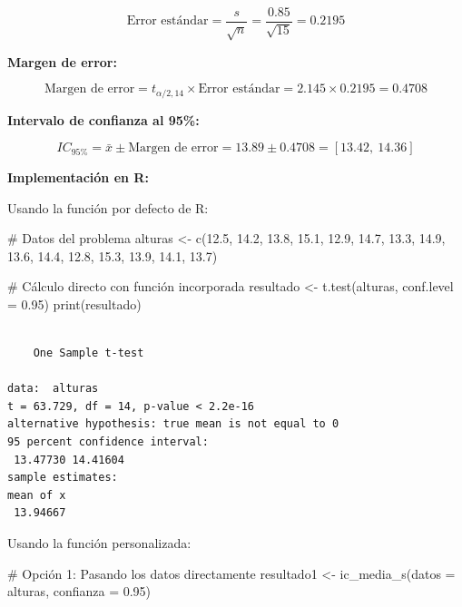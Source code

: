 \documentclass[
  spanish,
  letterpaper,
]{book}
\newenvironment{Shaded}{\begin{snugshade}}{\end{snugshade}}
\newcommand{\AttributeTok}[1]{\textcolor[rgb]{0.40,0.45,0.13}{#1}}
\newcommand{\CommentTok}[1]{\textcolor[rgb]{0.37,0.37,0.37}{#1}}
\newcommand{\FloatTok}[1]{\textcolor[rgb]{0.68,0.00,0.00}{#1}}
\newcommand{\FunctionTok}[1]{\textcolor[rgb]{0.28,0.35,0.67}{#1}}
\newcommand{\NormalTok}[1]{\textcolor[rgb]{0.00,0.23,0.31}{#1}}
\newcommand{\OtherTok}[1]{\textcolor[rgb]{0.00,0.23,0.31}{#1}}
\begin{document}
\[
\text{Error estándar} = \frac{s}{\sqrt{n}} = \frac{0.85}{\sqrt{15}} = 0.2195
\]

\textbf{Margen de error:}

\[
\text{Margen de error} = t_{\alpha/2,14} \times \text{Error estándar} = 2.145 \times 0.2195 = 0.4708
\]

\textbf{Intervalo de confianza al 95\%:}

\[
IC_{95\%} = \bar{x} \pm \text{Margen de error} = 13.89 \pm 0.4708 = [13.42,\ 14.36]
\]

\textbf{Implementación en R:}

Usando la función por defecto de R:

\begin{Shaded}
\begin{Highlighting}[]
\CommentTok{\# Datos del problema}
\NormalTok{alturas }\OtherTok{\textless{}{-}} \FunctionTok{c}\NormalTok{(}\FloatTok{12.5}\NormalTok{, }\FloatTok{14.2}\NormalTok{, }\FloatTok{13.8}\NormalTok{, }\FloatTok{15.1}\NormalTok{, }\FloatTok{12.9}\NormalTok{, }\FloatTok{14.7}\NormalTok{, }\FloatTok{13.3}\NormalTok{, }\FloatTok{14.9}\NormalTok{, }
             \FloatTok{13.6}\NormalTok{, }\FloatTok{14.4}\NormalTok{, }\FloatTok{12.8}\NormalTok{, }\FloatTok{15.3}\NormalTok{, }\FloatTok{13.9}\NormalTok{, }\FloatTok{14.1}\NormalTok{, }\FloatTok{13.7}\NormalTok{)}

\CommentTok{\# Cálculo directo con función incorporada}
\NormalTok{resultado }\OtherTok{\textless{}{-}} \FunctionTok{t.test}\NormalTok{(alturas, }\AttributeTok{conf.level =} \FloatTok{0.95}\NormalTok{)}
\FunctionTok{print}\NormalTok{(resultado)}
\end{Highlighting}
\end{Shaded}

\begin{verbatim}

    One Sample t-test

data:  alturas
t = 63.729, df = 14, p-value < 2.2e-16
alternative hypothesis: true mean is not equal to 0
95 percent confidence interval:
 13.47730 14.41604
sample estimates:
mean of x 
 13.94667 
\end{verbatim}

Usando la función personalizada:

\begin{Shaded}
\begin{Highlighting}[]
\CommentTok{\# Opción 1: Pasando los datos directamente}
\NormalTok{resultado1 }\OtherTok{\textless{}{-}} \FunctionTok{ic\_media\_s}\NormalTok{(}\AttributeTok{datos =}\NormalTok{ alturas, }\AttributeTok{confianza =} \FloatTok{0.95}\NormalTok{)}
\end{Highlighting}
\end{Shaded}
\end{document}
